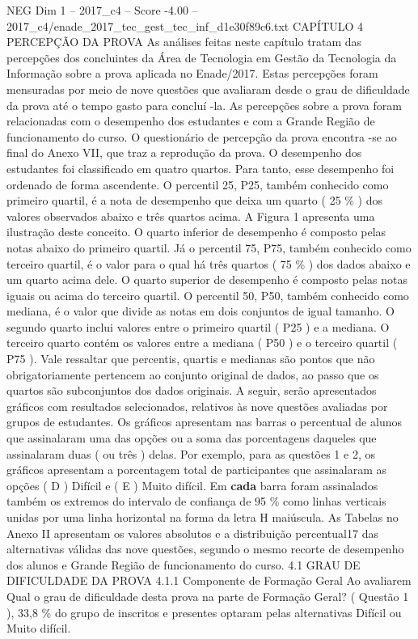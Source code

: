 \begin{textsample}{NEG Dim 1 – 2017\_c4 – Score -4.00 – 2017\_c4/enade\_2017\_tec\_gest\_tec\_inf\_d1e30f89c6.txt}  \label{ex:f1_neg_166}
CAPÍTULO 4 PERCEPÇÃO DA PROVA As análises feitas neste capítulo tratam das percepções dos concluintes da Área de Tecnologia em Gestão da Tecnologia da Informação sobre a prova aplicada no Enade/2017.
Estas percepções foram mensuradas por meio de nove questões que avaliaram desde o grau de dificuldade da prova até o tempo gasto para concluí -la.
As percepções sobre a prova foram relacionadas com o desempenho dos estudantes e com a Grande Região de funcionamento do curso.
O questionário de percepção da prova encontra -se ao final do Anexo VII, que traz a reprodução da prova.
O desempenho dos estudantes foi classificado em quatro quartos.
Para tanto, esse desempenho foi ordenado de forma ascendente.
O percentil 25, P25, também conhecido como primeiro quartil, é a nota de desempenho que deixa um quarto ( 25 \% ) dos valores observados abaixo e três quartos acima.
A Figura 1 apresenta uma ilustração deste conceito.
O quarto inferior de desempenho é composto pelas notas abaixo do primeiro quartil.
Já o percentil 75, P75, também conhecido como terceiro quartil, é o valor para o qual há três quartos ( 75 \% ) dos dados abaixo e um quarto acima dele.
O quarto superior de desempenho é composto pelas notas iguais ou acima do terceiro quartil.
O percentil 50, P50, também conhecido como mediana, é o valor que divide as notas em dois conjuntos de igual tamanho.
O segundo quarto inclui valores entre o primeiro quartil ( P25 ) e a mediana.
O terceiro quarto contém os valores entre a mediana ( P50 ) e o terceiro quartil ( P75 ).
Vale ressaltar que percentis, quartis e medianas são pontos que não obrigatoriamente pertencem ao conjunto original de dados, ao passo que os quartos são subconjuntos dos dados originais.
A seguir, serão apresentados gráficos com resultados selecionados, relativos às nove questões avaliadas por grupos de estudantes.
Os gráficos apresentam nas barras o percentual de alunos que assinalaram uma das opções ou a soma das porcentagens daqueles que assinalaram duas ( ou três ) delas.
Por exemplo, para as questões 1 e 2, os gráficos apresentam a porcentagem total de participantes que assinalaram as opções ( D ) Difícil e ( E ) Muito difícil.
Em \textbf{cada} barra foram assinalados também os extremos do intervalo de confiança de 95 \% como linhas verticais unidas por uma linha horizontal na forma da letra H maiúscula.
As Tabelas no Anexo II apresentam os valores absolutos e a distribuição percentual17 das alternativas válidas das nove questões, segundo o mesmo recorte de desempenho dos alunos e Grande Região de funcionamento do curso. 4.1 GRAU DE DIFICULDADE DA PROVA 4.1.1 Componente de Formação Geral Ao avaliarem Qual o grau de dificuldade desta prova na parte de Formação Geral? ( Questão 1 ), 33,8 \% do grupo de inscritos e presentes optaram pelas alternativas Difícil ou Muito difícil.

\end{textsample}
